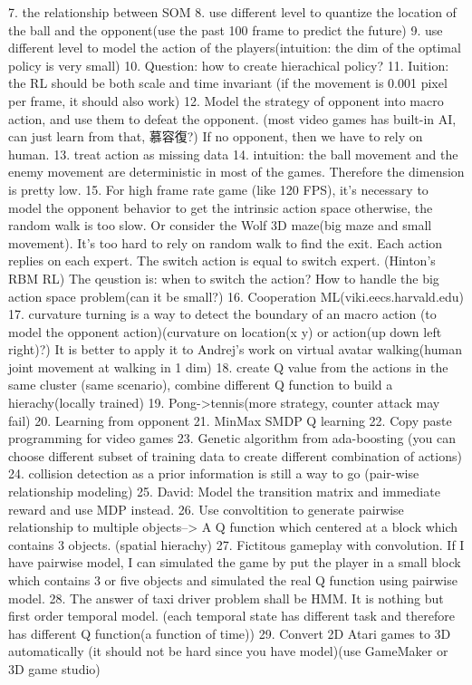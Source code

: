 7. the relationship between SOM
8. use different level to quantize the location of the ball and the opponent(use the past 100 frame to predict the future)
9. use different level to model the action of the players(intuition: the dim of the optimal policy is very small)
10. Question: how to create hierachical policy?
11. Iuition: the RL should be both scale and time invariant (if the movement is 0.001 pixel per frame, it should also work)
12. Model the strategy of opponent into macro action, and use them to defeat the opponent. (most video games has built-in AI, can just learn from that, 慕容復?)
If no opponent, then we have to rely on human.
13. treat action as missing data
14. intuition: the ball movement and the enemy movement are deterministic in most of the games. Therefore the dimension is pretty low.
15. For high frame rate game (like 120 FPS), it's necessary to model the opponent behavior to get the intrinsic action space
otherwise, the random walk is too slow. Or consider the Wolf 3D maze(big maze and small movement). It's too hard to rely on random walk to find the exit.
Each action replies on each expert. The switch action is equal to switch expert. (Hinton's RBM RL)
The qeustion is: when to switch the action? How to handle the big action space problem(can it be small?)
16. Cooperation ML(viki.eecs.harvald.edu)
17. curvature turning is a way to detect the boundary of an macro action (to model the opponent action)(curvature on location(x y) or action(up down left right)?)
It is better to apply it to Andrej's work on virtual avatar walking(human joint movement at walking in 1 dim)
18. create Q value from the actions in the same cluster (same scenario), combine different Q function to build a hierachy(locally trained)
19. Pong->tennis(more strategy, counter attack may fail)
20. Learning from opponent
21. MinMax SMDP Q learning
22. Copy paste programming for video games
23. Genetic algorithm from ada-boosting (you can choose different subset of training data to create different combination 
of actions)
24. collision detection as a prior information is still a way to go (pair-wise relationship modeling)
25. David: Model the transition matrix and immediate reward and use MDP instead.
26. Use convoltition to generate pairwise relationship to multiple objects--> A Q function which centered at a block which contains 
3 objects. (spatial hierachy)
27. Fictitous gameplay with convolution. If I have pairwise model, I can simulated the game by put the player in a 
small block which contains 3 or five objects and simulated the real Q function using pairwise model.
28. The answer of taxi driver problem shall be HMM. It is nothing but first order temporal model. (each temporal
state has different task and therefore has different Q function(a function of time))
29. Convert 2D Atari games to 3D automatically (it should not be hard since you have model)(use GameMaker or 3D game studio)


